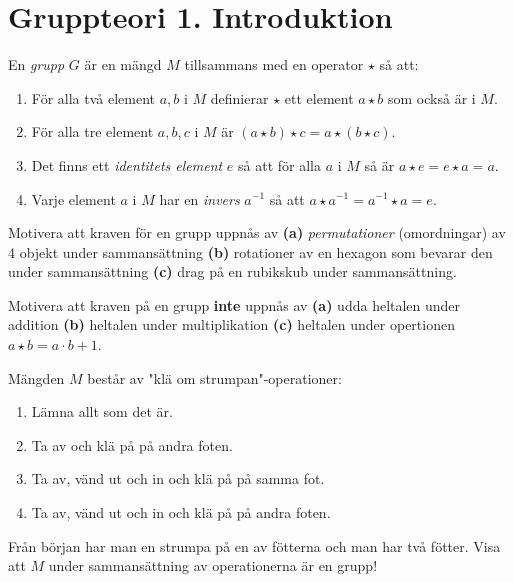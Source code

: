 \documentclass[11pt,fleqn]{book} %
\begin{document}
  \renewcommand*\rmdefault{ppl}\normalfont\upshape

\chapter{Gruppteori 1. Introduktion}
\large
\thispagestyle{empty}


\begin{definition} En \textit{grupp} \(G\) är en mängd \(M\) tillsammans med en operator \(\star \) så att:
  \begin{enumerate} %
    \item För alla två element \(a, b\) i \(M\) definierar \( \star \) ett element \(a  \star b\) som också är i \(M\).
    \item För alla tre element \(a, b, c\) i \(M\) är \((a  \star b)  \star c = a  \star (b  \star c)\).
    \item Det finns ett \textit{identitets element} \(e\) så att för alla \(a\) i \(M\) så är \(a  \star e = e  \star a = a\).
    \item Varje element \(a\) i \(M\) har en \textit{invers}  \(a ^{-1}\) så att \(a  \star a^{-1} = a^{-1}  \star a = e\).
  \end{enumerate}
\end{definition}

\begin{problem} Motivera att kraven för en grupp uppnås av
  \textbf{(a)} \textit{permutationer} (omordningar) av 4 objekt under sammansättning \textbf{(b)} rotationer av en hexagon som bevarar den under sammansättning \textbf{(c)} drag på en rubikskub under sammansättning.
\end{problem}

\begin{problem} Motivera att kraven på en grupp \textbf{inte} uppnås av 
  \textbf{(a)} udda heltalen under addition \textbf{(b)} heltalen under multiplikation \textbf{(c)} heltalen under opertionen \(a  \star b = a  \cdot b + 1\).
\end{problem}

\begin{problem}
  Mängden \(M\) består av "klä om strumpan"-operationer:
  \begin{enumerate}
    \item Lämna allt som det är.
    \item Ta av och klä på på andra foten.
    \item Ta av, vänd ut och in och klä på på samma fot.
    \item Ta av, vänd ut och in och klä på på andra foten.
  \end{enumerate}
  Från början har man en strumpa på en av fötterna och man har två fötter. Visa att \(M\) under sammansättning av operationerna är en grupp!
\end{problem}
\end{document}
